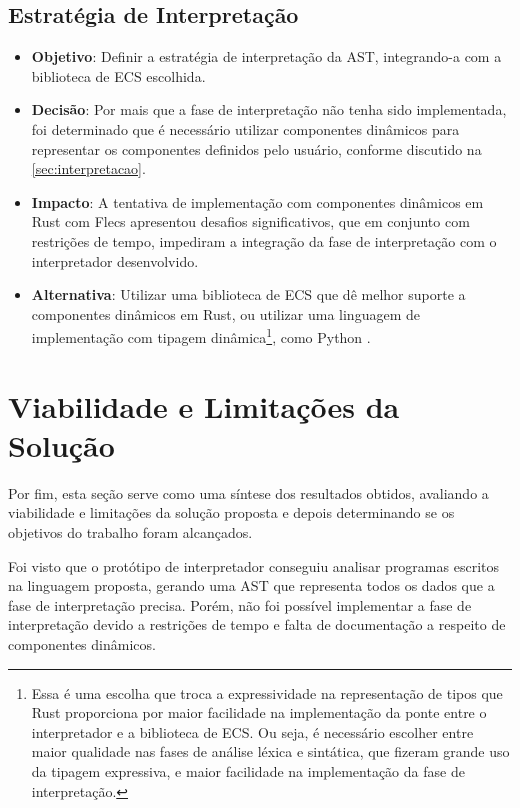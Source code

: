 \subsection{Estratégia de Interpretação}

\begin{itemize}
	\item \textbf{Objetivo}: Definir a estratégia de interpretação da AST, integrando-a com a biblioteca de ECS escolhida.
	\item \textbf{Decisão}: Por mais que a fase de interpretação não tenha sido implementada, foi determinado que é necessário utilizar componentes dinâmicos para representar os componentes definidos pelo usuário, conforme discutido na \autoref{sec:interpretacao}.
	\item \textbf{Impacto}: A tentativa de implementação com componentes dinâmicos em Rust com Flecs apresentou desafios significativos, que em conjunto com restrições de tempo, impediram a integração da fase de interpretação com o interpretador desenvolvido.
	\item \textbf{Alternativa}: Utilizar uma biblioteca de ECS que dê melhor suporte a componentes dinâmicos em Rust, ou utilizar uma linguagem de implementação com tipagem dinâmica\footnote{Essa é uma escolha que troca a expressividade na representação de tipos que Rust proporciona por maior facilidade na implementação da ponte entre o interpretador e a biblioteca de ECS. Ou seja, é necessário escolher entre maior qualidade nas fases de análise léxica e sintática, que fizeram grande uso da tipagem expressiva, e maior facilidade na implementação da fase de interpretação.}, como Python \cite{python}.
\end{itemize}

\section{Viabilidade e Limitações da Solução} \label{sec:viabilidade_limitacoes}

Por fim, esta seção serve como uma síntese dos resultados obtidos, avaliando a viabilidade e limitações da solução proposta e depois determinando se os objetivos do trabalho foram alcançados.

Foi visto que o protótipo de interpretador conseguiu analisar programas escritos na linguagem proposta, gerando uma AST que representa todos os dados que a fase de interpretação precisa. Porém, não foi possível implementar a fase de interpretação devido a restrições de tempo e falta de documentação a respeito de componentes dinâmicos.

